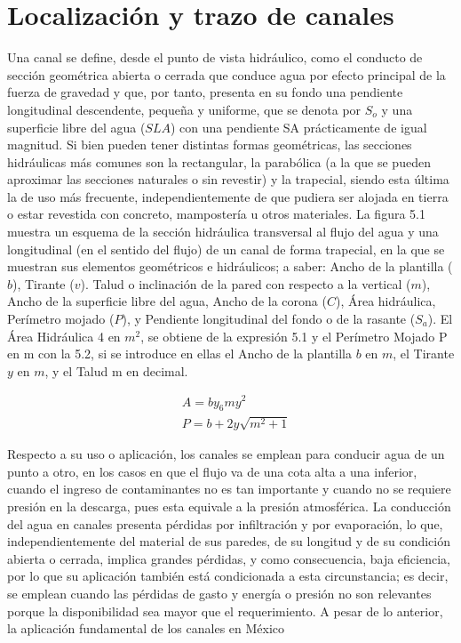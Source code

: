 \section{Localización y trazo de canales}

Una canal se define, desde el punto de vista hidráulico, como el conducto de sección geométrica abierta o cerrada que conduce agua por efecto principal de la fuerza de gravedad y que, por tanto, presenta en su fondo una pendiente longitudinal descendente, pequeña y uniforme, que se denota por $S_o$ y una superficie libre del agua ($SLA$) con una pendiente SA prácticamente de igual magnitud. Si bien pueden tener distintas formas geométricas, las secciones hidráulicas más comunes son la rectangular, la parabólica (a la que se pueden aproximar las secciones naturales o sin revestir) y la trapecial, siendo esta última la de uso más frecuente, independientemente de que pudiera ser alojada en tierra o estar revestida con concreto, mampostería u otros materiales. La figura 5.1 muestra un esquema de la sección hidráulica transversal al flujo del agua y una longitudinal (en el sentido del flujo) de un canal de forma trapecial, en la que se muestran sus elementos geométricos e hidráulicos; a saber: Ancho de la plantilla ($b$), Tirante ($v$). Talud o inclinación de la pared con respecto a la vertical ($m$), Ancho de la superficie libre del agua, Ancho de la corona ($C$), Área hidráulica, Perímetro mojado ($P$), y Pendiente longitudinal del fondo o de la rasante ($S_a$). El Área Hidráulica 4 en $m^2$, se obtiene de la expresión 5.1 y el Perímetro Mojado P en m con la 5.2, si se introduce en ellas el Ancho de la plantilla $b$ en $m$, el Tirante $y$ en $m$, y el Talud m en decimal.

\begin{align}
    &A = by_6my^2\\
    &P = b + 2y \sqrt{m^2+ 1}
\end{align}

Respecto a su uso o aplicación, los canales se emplean para conducir agua de un punto a otro, en los casos en que el flujo va de una cota alta a una inferior, cuando el ingreso de contaminantes no es tan importante y cuando no se requiere presión en la descarga, pues esta equivale a la presión atmosférica. La conducción del agua en canales presenta pérdidas por infiltración y por evaporación, lo que, independientemente del material de sus paredes, de su longitud y de su condición abierta o cerrada, implica grandes pérdidas, y como consecuencia, baja eficiencia, por lo que su aplicación también está condicionada a esta circunstancia; es decir, se emplean cuando las pérdidas de gasto y energía o presión no son relevantes porque la disponibilidad sea mayor que el requerimiento. A pesar de lo anterior, la aplicación fundamental de los canales en México

